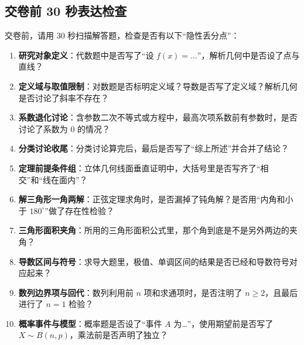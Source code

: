 \documentclass[11pt,a4paper]{ctexart}
\begin{document}
\subsection{交卷前 30 秒表达检查}
\begin{tcolorbox}[
  enhanced,
  colback=white,
  colframe=black,
  boxrule=0.8pt,
  arc=0pt,
  left=8pt, right=8pt, top=6pt, bottom=6pt,
  title={\small\bfseries 交卷前 30 秒表达检查清单}
]
  {\small
  交卷前，请用 30 秒扫描解答题，检查是否有以下“隐性丢分点”：
  \begin{enumerate}[label=\checkbox , leftmargin=2em, itemsep=0.15em, topsep=0.2em]
    \item \textbf{研究对象定义}：代数题中是否写了“设 \(f(x) = \dots\)”，解析几何中是否设了点与直线？
    \item \textbf{定义域与取值限制}：对数题是否标明定义域？导数是否写了定义域？解析几何是否讨论了斜率不存在？
    \item \textbf{系数退化讨论}：含参数二次不等式或方程中，最高次项系数前有参数时，是否讨论了系数为 0 的情况？
    \item \textbf{分类讨论收尾}：分类讨论算完后，最后是否写了“综上所述”并合并了结论？
    \item \textbf{定理前提条件组}：立体几何线面垂直证明中，大括号里是否写齐了“相交”和“线在面内”？
    \item \textbf{解三角形一角两解}：正弦定理求角时，是否漏掉了钝角解？是否用“内角和小于 \(180^\circ\)”做了存在性检验？
    \item \textbf{三角形面积夹角}：所用的三角形面积公式里，那个角到底是不是另外两边的夹角？
    \item \textbf{导数区间与符号}：求导大题里，极值、单调区间的结果是否已经和导数符号对应起来？
    \item \textbf{数列边界项与回代}：数列利用前 \(n\) 项和求通项时，是否注明了 \(n \ge 2\)，且最后进行了 \(n=1\) 检验？
    \item \textbf{概率事件与模型}：概率题是否设了“事件 \(A\) 为\dots”，使用期望前是否写了 \(X \sim B(n,p)\)，乘法前是否声明了独立？
  \end{enumerate}
  }
\end{tcolorbox}
\end{document}
